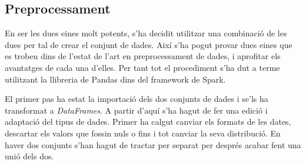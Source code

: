 \documentclass[10pt,a4paper,twocolumn,twoside]{article}
\begin{document}
\subsection{Preprocessament}
En ser les dues eines molt potents, s'ha decidit utilitzar una combinació de les dues per tal de crear el conjunt de dades. Així s'ha pogut provar dues eines que es troben dins de l'estat de l'art en preprocessament de dades, i aprofitar els avantatges de cada una d'elles. Per tant tot el procediment s'ha dut a terme utilitzant la llibreria de Pandas dins del framework de Spark.

El primer pas ha estat la importació dels dos conjunts de dades i se'ls ha transformat a \textit{DataFrames}. A partir d'aquí s'ha hagut de fer una edició i adaptació del tipus de dades. Primer ha calgut canviar els formats de les dates, descartar els valors que fossin nuls o fins i tot canviar la seva distribució. En haver dos conjunts s'han hagut de tractar per separat per després acabar fent una unió dels dos.
\end{document}
